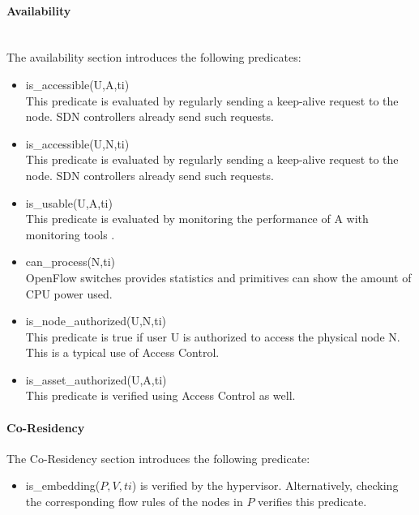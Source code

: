 \paragraph{Availability}\textbf{\\}
The availability section introduces the following predicates:
\begin{itemize}
\item is\_accessible(U,A,ti)
\\ This predicate is evaluated by regularly sending a keep-alive request to the node. SDN controllers already send such requests.

\item is\_accessible(U,N,ti)
\\ This predicate is evaluated by regularly sending a keep-alive request to the node. SDN controllers already send such requests.


\item is\_usable(U,A,ti)
\\This predicate is evaluated by monitoring the performance of A with monitoring tools .


\item can\_process(N,ti)
\\ OpenFlow switches provides statistics and primitives can show the amount of CPU power used.

\item is\_node\_authorized(U,N,ti)\\
This predicate is true if user U is authorized to access the physical node N.
This is a typical use of Access Control.

\item is\_asset\_authorized(U,A,ti)\\
This predicate is verified using Access Control as well.
\end{itemize}


 
 
\paragraph{Co-Residency}
The Co-Residency section introduces the following predicate:

\begin{itemize}
    \item is\_embedding($P,V,ti$) is verified by the hypervisor. Alternatively, checking the corresponding flow rules of the nodes in $P$ verifies this predicate.
\end{itemize}